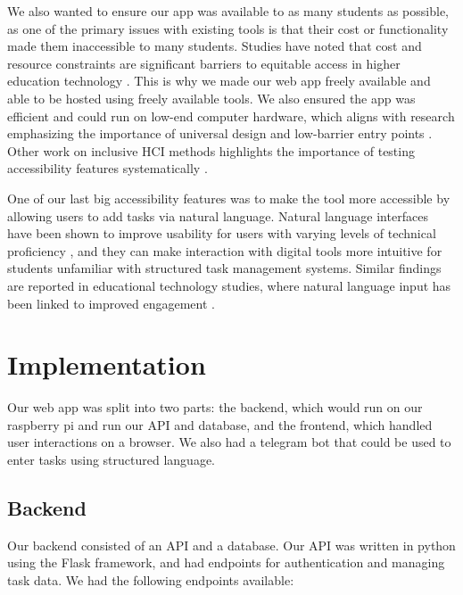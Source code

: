 \documentclass[11pt,oneside]{article}
\begin{document}
We also wanted to ensure our app was available to as many students as possible, as one of the primary issues with existing tools is that their cost or functionality made them inaccessible to many students. Studies have noted that cost and resource constraints are significant barriers to equitable access in higher education technology \citep{selwyn2021education}. This is why we made our web app freely available and able to be hosted using freely available tools. We also ensured the app was efficient and could run on low-end computer hardware, which aligns with research emphasizing the importance of universal design and low-barrier entry points \citep{rose2002teaching}. Other work on inclusive HCI methods highlights the importance of testing accessibility features systematically \citep{lazar2017research}.

One of our last big accessibility features was to make the tool more accessible by allowing users to add tasks via natural language.  Natural language interfaces have been shown to improve usability for users with varying levels of technical proficiency \citep{shneiderman2010designing}, and they can make interaction with digital tools more intuitive for students unfamiliar with structured task management systems. Similar findings are reported in educational technology studies, where natural language input has been linked to improved engagement \citep{junco2012relationship}.


\section{Implementation}

Our web app was split into two parts: the backend, which would run on our raspberry pi and run our API and database, and the frontend, which handled user interactions on a browser. We also had a telegram bot that could be used to enter tasks using structured language.

\subsection{Backend}
Our backend consisted of an API and a database. Our API was written in python using the Flask framework, and had endpoints for authentication and managing task data. We had the following endpoints available:
\end{document}
